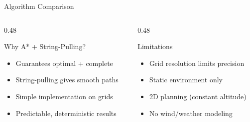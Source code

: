\documentclass[aspectratio=169, 11pt]{beamer}
\begin{document}
\begin{frame}{Algorithm Comparison}
\vspace{0.3cm}
\begin{columns}[T]
\begin{column}{0.48\textwidth}
\begin{exampleblock}{Why A* + String-Pulling?}
\footnotesize
\begin{itemize}
    \item Guarantees optimal + complete
    \item String-pulling gives smooth paths
    \item Simple implementation on grids
    \item Predictable, deterministic results
\end{itemize}
\end{exampleblock}
\end{column}
\begin{column}{0.48\textwidth}
\begin{alertblock}{Limitations}
\footnotesize
\begin{itemize}
    \item Grid resolution limits precision
    \item Static environment only
    \item 2D planning (constant altitude)
    \item No wind/weather modeling
\end{itemize}
\end{alertblock}
\end{column}
\end{columns}
\end{frame}
\end{document}
